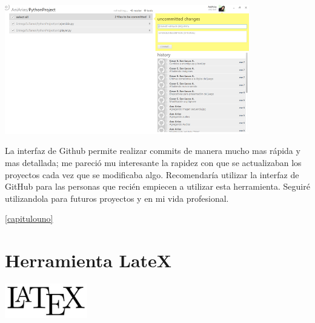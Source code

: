 \documentclass[12pt]{report}
\begin{document}
	\begin{center}
		\begingroup
			\includegraphics[width=0.8\textwidth]{imagenes_usuario/git3.png}
\newline
\newline
		\endgroup
	\end{center}

La interfaz de Github permite realizar commits de manera mucho mas rápida y mas detallada; me pareció mu interesante la rapidez con que se actualizaban los proyectos cada vez que se modificaba algo.
Recomendaría utilizar la interfaz de GitHub para las personas que recién empiecen a utilizar esta herramienta.
\newline
\newline
Seguiré utilizandola para futuros proyectos y en mi vida profesional.

 \ref{capitulouno}




\chapter{Herramienta LateX\label{capitulouno}}

	\begin{center}
		\begingroup
			\includegraphics[width=0.27\textwidth]{imagenes_usuario/latex.jpg}
		\endgroup
	\end{center}
\end{document}
